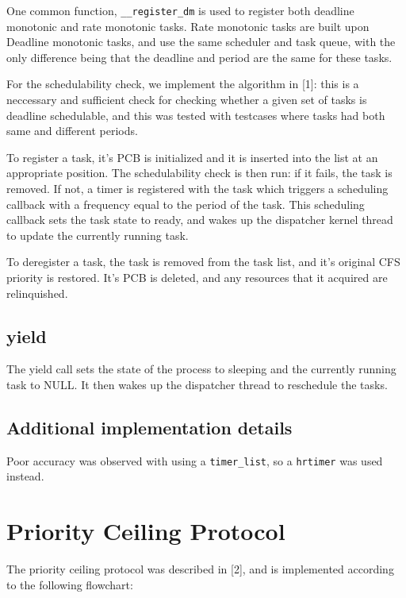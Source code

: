 \documentclass[12pt]{article}
\begin{document}
One common function, \texttt{\_\_register\_dm} is used to register both deadline
monotonic and rate monotonic tasks. Rate monotonic tasks are built upon
Deadline monotonic tasks, and use the same scheduler and task queue, with the
only difference being that the deadline and period are the same for these tasks.

For the schedulability check, we implement the algorithm in [1]: this is a 
neccessary and sufficient check for checking whether a given set of tasks is 
deadline schedulable, and this was tested with testcases where tasks had both 
same and different periods.

To register a task, it's PCB is initialized and it is inserted into the list at 
an appropriate position. The schedulability check is then run: if it fails, the
task is removed. If not, a timer is registered with the task which triggers 
a scheduling callback with a frequency equal to the period of the task. This 
scheduling callback sets the task state to ready, and wakes up the dispatcher 
kernel thread to update the currently running task.

To deregister a task, the task is removed from the task list, and it's original
CFS priority is restored. It's PCB is deleted, and any resources that it 
acquired are relinquished.

\subsection{yield}

The yield call sets the state of the process to sleeping and the currently running
task to NULL. It then wakes up the dispatcher thread to reschedule the tasks.

\subsection{Additional implementation details}

Poor accuracy was observed with using a \texttt{timer\_list}, so a \texttt{hrtimer}
was used instead.

\pagebreak
\section{Priority Ceiling Protocol}

The priority ceiling protocol was described in [2], and is implemented according
to the following flowchart:
\end{document}
